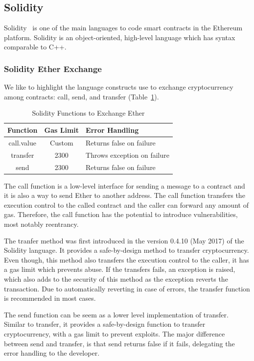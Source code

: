 \documentclass[10pt,conference]{IEEEtran}
\begin{document}
\subsection{Solidity}

Solidity~\cite{solidity} is one of the main languages to code smart contracts in the Ethereum platform.  Solidity is an object-oriented, high-level language which has syntax comparable to C++.  

\subsubsection{Solidity Ether Exchange}

We like to highlight the language constructs use to exchange cryptocurrency among contracts: call, send, and transfer (Table~\ref{tab:freq}).

\begin{table}
\center
  \caption{Solidity Functions to Exchange Ether}
  \label{tab:freq}
  \begin{tabular}{ccl}
    \hline
    Function & Gas Limit & Error Handling\\
    \hline
    call.value & Custom & Returns false on failure\\
    transfer & 2300 & Throws exception on failure\\
    send&2300& Returns false on failure\\
  \hline
\end{tabular}
\end{table}

The call function is a low-level interface for sending a message to a contract and it is also a way to send Ether to another address.  The call function transfers the execution control to the called contract and the caller can forward any amount of gas.  Therefore,  the call function has the potential to introduce vulnerabilities, most notably reentrancy.  

The tranfer method was first introduced in the version 0.4.10 (May 2017) of the Solidity language.  It provides a safe-by-design method to transfer cryptocurrency.  Even though, this method also transfers the execution control to the caller,  it has a gas limit which prevents abuse.  If the transfers fails,  an exception is raised, which also adds to the security of this method as the exception reverts the transaction.  Due to automatically reverting in case of errors, the transfer function is recommended in most cases. 

The send function can be seem as a lower level implementation of transfer.  Similar to transfer,  it provides a safe-by-design function to transfer cryptocurrency,  with a gas limit to prevent exploits. The major difference between send and transfer, is that send returns false if it fails, delegating the error handling to the developer.
\end{document}
